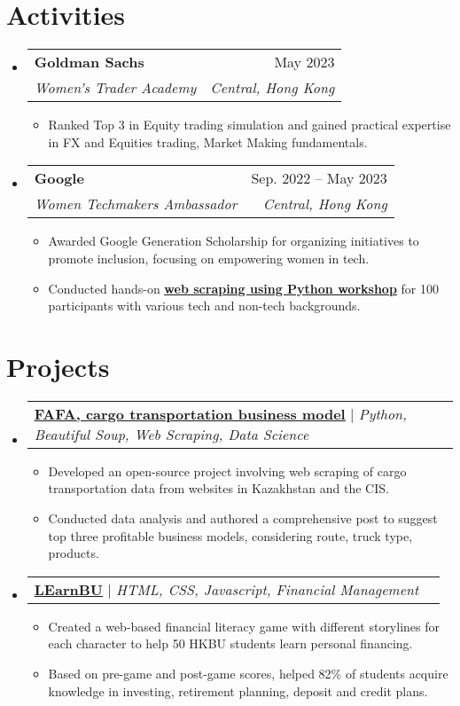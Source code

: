 \documentclass[letterpaper,10.5pt]{article}
\makeatletter
\newcommand{\resumeItem}[1]{
  \item\small{
    {#1 \vspace{-2pt}}
  }
}
\newcommand{\resumeSubheading}[4]{
  \vspace{-2pt}\item
    \begin{tabular*}{1\textwidth}[t]{l@{\extracolsep{\fill}}r}
      \textbf{#1} & #2 \\
      \textit{\small#3} & \textit{\small #4} \\
    \end{tabular*}\vspace{-7pt}
}
\newcommand{\resumeSubSubheading}[2]{
    \item
    \begin{tabular*}{1\textwidth}{l@{\extracolsep{\fill}}r}
      \textit{\small#1} & \textit{\small #2} \\
    \end{tabular*}\vspace{-7pt}
}
\newcommand{\resumeProjectHeading}[2]{
    \item
    \begin{tabular*}{1\textwidth}{l@{\extracolsep{\fill}}r}
      \small#1 & #2 \\
    \end{tabular*}\vspace{-7pt}
}
\newcommand{\resumeSubHeadingListStart}{\begin{itemize}[leftmargin=0.0in, label={}]}
\newcommand{\resumeSubHeadingListEnd}{\end{itemize}}
\newcommand{\resumeItemListStart}{\begin{itemize}}
\newcommand{\resumeItemListEnd}{\end{itemize}\vspace{-5pt}}
\makeatother
\begin{document}
\section{Activities}
  \resumeSubHeadingListStart
    \resumeSubheading
      {Goldman Sachs}{May 2023}
      {Women’s Trader Academy}{Central, Hong Kong}
      \resumeItemListStart
        \resumeItem{Ranked Top 3 in Equity trading simulation and gained practical expertise in FX and Equities trading, Market Making fundamentals.}
      \resumeItemListEnd
       \resumeSubheading
      {Google}{Sep. 2022 -- May 2023}
      {Women Techmakers Ambassador}{Central, Hong Kong}
      \resumeItemListStart
        \resumeItem{Awarded Google Generation Scholarship for organizing initiatives to promote inclusion, focusing on empowering women in tech.}
        \resumeItem{Conducted hands-on \underline{\href{https://www.linkedin.com/posts/ayazhankad_today-i-was-the-speaker-for-the-hands-on-activity-7038903549317050368-JdYM?utm_source=share&utm_medium=member_desktop}{\textbf{web scraping using Python workshop}}} for 100 participants with various tech and non-tech backgrounds. }
      \resumeItemListEnd
\resumeSubHeadingListEnd
      

\section{Projects}
    \resumeSubHeadingListStart
      \resumeProjectHeading
      {\underline{\href{https://ayazhankad-coding.blogspot.com/2021/09/scraping-fafakz-for-almaty-delivery.html}{\textbf{FAFA, cargo transportation business model}}} $|$ \emph{Python, Beautiful Soup, Web Scraping, Data Science}}{}
          \resumeItemListStart
            \resumeItem{Developed an open-source project involving web scraping of cargo transportation data from websites in Kazakhstan and the CIS.}
            \resumeItem{Conducted data analysis and authored a comprehensive post to suggest top three profitable business models, considering route, truck type, products.}
          \resumeItemListEnd

      \resumeProjectHeading
{\underline{\href{https://github.com/ayazhankadessova/FinanceGame}{\textbf{LEarnBU}}} $|$ \emph{HTML, CSS, Javascript, Financial Management}}{}
          \resumeItemListStart
            \resumeItem{Created a web-based financial literacy game with different storylines for each character to help 50 HKBU students learn personal financing. }
            \resumeItem{Based on pre-game and post-game scores, helped 82\% of students acquire knowledge in investing, retirement planning, deposit and credit plans.}
          \resumeItemListEnd
    \resumeSubHeadingListEnd
%
\end{document}
